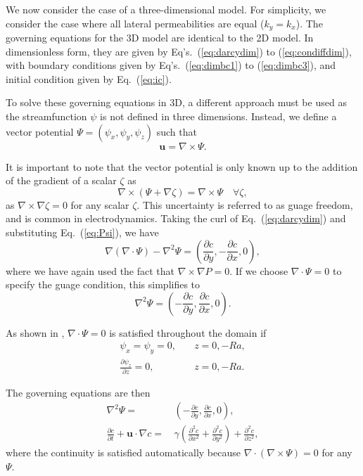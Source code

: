 \documentclass[11pt, a4paper]{csiroreport2012}
\begin{document}
We now consider the case of a three-dimensional model. For simplicity, we consider the case where all lateral permeabilities are equal ($k_y = k_x$). The governing equations for the 3D model are identical to the 2D model. In dimensionless form, they are given by Eq's.~(\ref{eq:darcydim}) to (\ref{eq:condiffdim}), with boundary conditions given by Eq's.~(\ref{eq:dimbc1}) to (\ref{eq:dimbc3}), and initial condition given by Eq.~(\ref{eq:ic}).

To solve these governing equations in 3D, a different approach must be used as the streamfunction $\psi$ is not defined in three dimensions. Instead, we define a vector potential $\Psi = (\psi_x, \psi_y, \psi_z)$ such that
\begin{equation}
\mathbf{u} = \nabla \times \Psi.
\label{eq:Psi}
\end{equation}

It is important to note that the vector potential is only known up to the addition of the gradient of a scalar $\zeta$ as 
\begin{equation}
\nabla \times \left( \Psi + \nabla \zeta \right) = \nabla \times \Psi \quad \forall \zeta,
\end{equation}
as $\nabla \times \nabla \zeta = 0$ for any scalar $\zeta$. This uncertainty is referred to as guage freedom, and is common in electrodynamics. Taking the curl of Eq.~(\ref{eq:darcydim}) and substituting Eq.~(\ref{eq:Psi}), we have 
\begin{equation}
\nabla(\nabla \cdot \Psi) - \nabla^2 \Psi = \left(\frac{\partial c}{\partial y}, - \frac{\partial c}{\partial x}, 0\right),
\end{equation}
where we have again used the fact that $\nabla \times \nabla P = 0$. If we choose $\nabla \cdot \Psi = 0$ to specify the guage condition, this simplifies to
\begin{equation}
\nabla^2 \Psi = \left(-\frac{\partial c}{\partial y},  \frac{\partial c}{\partial x}, 0\right).
\label{eq:poisson}
\end{equation}

As shown in \cite{E1997}, $\nabla \cdot \Psi = 0$ is satisfied throughout the domain if 
\begin{align}
\psi_x = \psi_y = 0,& \quad z = 0, -Ra, \nonumber \\
\frac{\partial \psi_z}{\partial z} = 0, & \quad  z = 0, -Ra.
\end{align}

The governing equations are then 
\begin{align}
\nabla^2 \Psi = \,& \left(-\frac{\partial c}{\partial y}, \frac{\partial c}{\partial x}, 0 \right), \label{eq:darcy3d} \\
\frac{\partial c}{\partial t} + \mathbf{u} \cdot \nabla c = \, & \gamma \left( \frac{\partial^2 c}{\partial x^2} + \frac{\partial^2 c}{\partial y^2} \right) + \frac{\partial^2 c}{\partial z^2}, \label{eq:convdiff3d}
\end{align}
where the continuity is satisfied automatically because $\nabla \cdot \left( \nabla \times \Psi \right) = 0$ for any $\Psi$.
\end{document}

